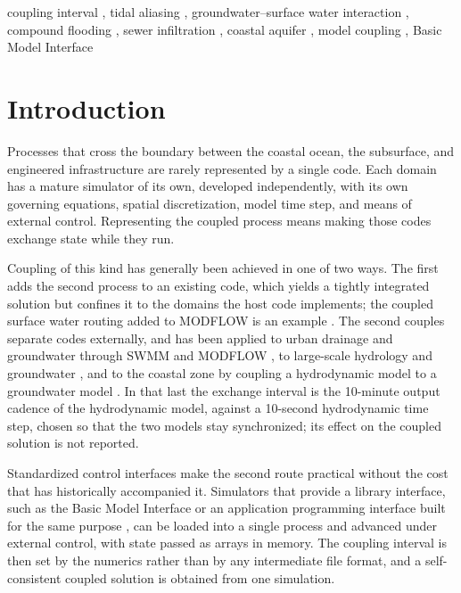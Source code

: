 \documentclass[preprint,authoryear,11pt]{elsarticle}
\begin{document}
\begin{frontmatter}
\begin{keyword}
coupling interval \sep
tidal aliasing \sep
groundwater--surface water interaction \sep
compound flooding \sep
sewer infiltration \sep
coastal aquifer \sep
model coupling \sep
Basic Model Interface
\end{keyword}

\end{frontmatter}

\section{Introduction}

Processes that cross the boundary between the coastal ocean, the subsurface, and engineered infrastructure are rarely represented by a single code. Each domain has a mature simulator of its own, developed independently, with its own governing equations, spatial discretization, model time step, and means of external control. Representing the coupled process means making those codes exchange state while they run.

Coupling of this kind has generally been achieved in one of two ways. The first adds the second process to an existing code, which yields a tightly integrated solution but confines it to the domains the host code implements; the coupled surface water routing added to MODFLOW is an example \citep{hughes2014swr}. The second couples separate codes externally, and has been applied to urban drainage and groundwater through SWMM and MODFLOW \citep{zhang2020swmmmodflow, li2022urbansaturated, tajari2026compound}, to large-scale hydrology and groundwater \citep{guillaumot2022cwatm}, and to the coastal zone by coupling a hydrodynamic model to a groundwater model \citep{jin2025gwocean}. In that last the exchange interval is the 10-minute output cadence of the hydrodynamic model, against a 10-second hydrodynamic time step, chosen so that the two models stay synchronized; its effect on the coupled solution is not reported.

Standardized control interfaces make the second route practical without the cost that has historically accompanied it. Simulators that provide a library interface, such as the Basic Model Interface \citep{hutton2020bmi} or an application programming interface built for the same purpose \citep{hughes2022modflowapi}, can be loaded into a single process and advanced under external control, with state passed as arrays in memory. The coupling interval is then set by the numerics rather than by any intermediate file format, and a self-consistent coupled solution is obtained from one simulation.
\end{document}
